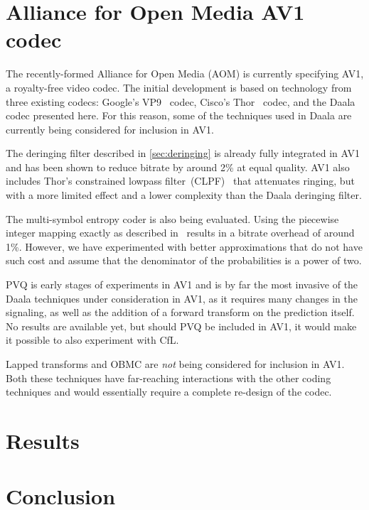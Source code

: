 \documentclass[english,conference,10pt]{IEEEtran}
\begin{document}
\section{Alliance for Open Media AV1 codec}
\label{sec:AOM}

The recently-formed Alliance for Open Media (AOM) is currently specifying
AV1, a royalty-free video codec. The initial development is based on
technology from three existing codecs: Google's VP9~\cite{VP9Spec} codec,
Cisco's Thor~\cite{ThorDraft} codec, and the Daala codec presented
here. For this reason, some of the techniques used in Daala are currently
being considered for inclusion in AV1.

The deringing filter described in \cref{sec:deringing} is already
fully integrated in AV1 and has been shown to reduce bitrate by around 2\%
at equal quality. AV1 also includes Thor's constrained lowpass
filter~(CLPF)~\cite{CLPFDraft} that attenuates ringing, but with a more
limited effect and a lower complexity than the Daala deringing filter.

The multi-symbol entropy coder is also being evaluated. Using the piecewise
integer mapping exactly as described in~\cite{stuiver1998piecewise} results
in a bitrate overhead of around 1\%. However, we have experimented with
better approximations that do not have such cost and assume that
the denominator of the probabilities is a power of two.

PVQ is early stages of experiments in AV1 and is by far the most invasive
of the Daala techniques under consideration in AV1, as it requires many changes
in the signaling, as well as the addition of a forward transform on the
prediction itself. No results are available yet, but should PVQ be
included in AV1, it would make it possible to also experiment with CfL.

Lapped transforms and OBMC are \textit{not} being considered for inclusion
in AV1. Both these techniques have far-reaching interactions with the
other coding techniques and would essentially require a complete re-design
of the codec.

\section{Results}
\label{sec:Results}


\section{Conclusion}



\end{document}
